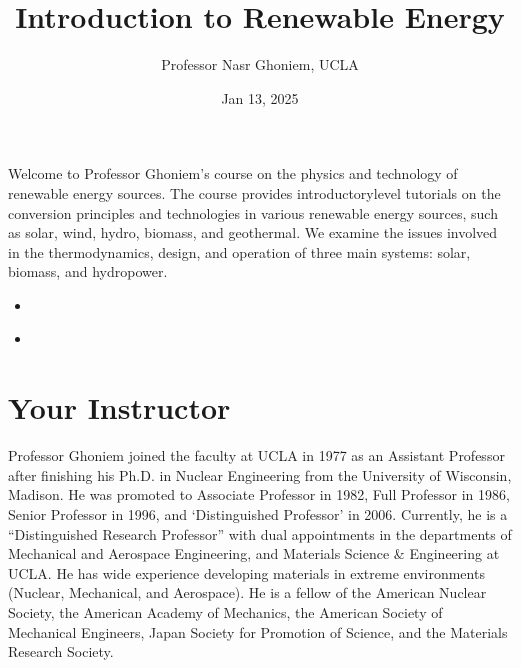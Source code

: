 \documentclass[letterpaper,10pt,english]{jupyterBook}
\title{Introduction to Renewable Energy}
\date{Jan 13, 2025}
\author{Professor Nasr Ghoniem, UCLA}
\begin{document}
\pagestyle{empty}
\sphinxmaketitle
\pagestyle{plain}
\sphinxtableofcontents
\pagestyle{normal}
\label{\detokenize{intro::doc}}


\sphinxAtStartPar
Welcome to Professor Ghoniem’s course on the physics and technology of renewable energy sources. The course provides introductory\sphinxhyphen{}level tutorials on the
conversion principles and technologies in various renewable energy sources,
such as solar, wind, hydro, biomass, and geothermal. We examine the
issues involved in the thermodynamics, design, and operation of three
main systems: solar, biomass, and hydro\sphinxhyphen{}power.
\begin{itemize}
\item {} 
\sphinxAtStartPar
{\hyperref[\detokenize{Syllabus::doc}]{}}

\item {} 
\sphinxAtStartPar
{\hyperref[\detokenize{ProjectInstructions::doc}]{}}

\end{itemize}

\sphinxstepscope


\chapter{Your Instructor}
\label{\detokenize{Syllabus:your-instructor}}\label{\detokenize{Syllabus::doc}}
\sphinxAtStartPar
Professor Ghoniem joined the faculty at UCLA in 1977 as an Assistant
Professor after finishing his Ph.D. in Nuclear Engineering from the
University of Wisconsin, Madison. He was promoted to Associate Professor
in 1982, Full Professor in 1986, Senior Professor in 1996, and
‘Distinguished Professor’ in 2006. Currently, he is a “Distinguished
Research Professor” with dual appointments in the departments of
Mechanical and Aerospace Engineering, and Materials Science \&
Engineering at UCLA. He has wide experience developing
materials in extreme environments (Nuclear, Mechanical, and Aerospace).
He is a fellow of the American Nuclear Society, the American Academy of
Mechanics, the American Society of Mechanical Engineers, Japan
Society for Promotion of Science, and the Materials Research Society.

\sphinxAtStartPar
{}
\end{document}
